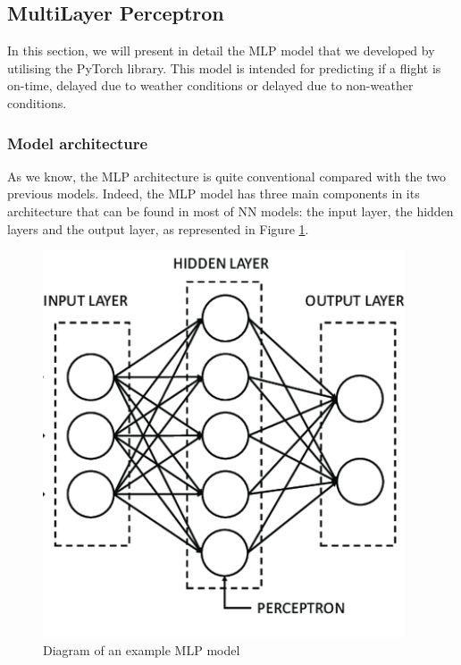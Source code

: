 \documentclass[12pt,oneside]{book} %
\begin{document}
\subsection{MultiLayer Perceptron}

\noindent In this section, we will present in detail the MLP model that we developed by utilising the PyTorch library. This model is intended for predicting if a flight is on-time, delayed due to weather conditions or delayed due to non-weather conditions.

\subsubsection{Model architecture}

\noindent As we know, the MLP architecture is quite conventional compared with the two previous models. Indeed, the MLP model has three main components in its architecture that can be found in most of NN models: the input layer, the hidden layers and the output layer, as represented in Figure \ref{fig:MLP_model}.

\begin{figure}[H]
    \centering
    \includegraphics[width=0.6\linewidth]{Image/MLP.png}
    \caption{\centering Diagram of an example MLP model}
    \label{fig:MLP_model}
\end{figure}
\end{document}
